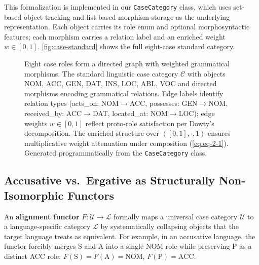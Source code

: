 \documentclass[
]{article}
\makeatletter
\newcommand*\pandocbounded[1]{%
  \sbox\pandoc@box{#1}%
  \Gscale@div\@tempa{\textheight}{\dimexpr\ht\pandoc@box+\dp\pandoc@box\relax}%
  \Gscale@div\@tempb{\linewidth}{\wd\pandoc@box}%
  \ifdim\@tempb\p@<\@tempa\p@\let\@tempa\@tempb\fi%
  \ifdim\@tempa\p@<\p@\scalebox{\@tempa}{\usebox\pandoc@box}%
  \else\usebox{\pandoc@box}%
  \fi%
}
\makeatother
\begin{document}
This formalization is implemented in our \texttt{CaseCategory} class,
which uses set-based object tracking and list-based morphism storage as
the underlying representation. Each object carries its role enum and
optional morphosyntactic features; each morphism carries a relation
label and an enriched weight \(w \in [0,1]\).
\autoref{fig:case-standard} shows the full eight-case standard category.

\begin{figure}
\centering
\pandocbounded{\includegraphics[keepaspectratio,alt={Eight case roles form a directed graph with weighted grammatical morphisms. The standard linguistic case category \textbackslash mathcal\{C\} with objects NOM, ACC, GEN, DAT, INS, LOC, ABL, VOC and directed morphisms encoding grammatical relations. Edge labels identify relation types (acts\_on: NOM\textbackslash toACC, possesses: GEN\textbackslash toNOM, received\_by: ACC\textbackslash toDAT, located\_at: NOM\textbackslash toLOC); edge weights w \textbackslash in \[0,1\] reflect proto-role satisfaction per Dowty's \[@dowty1991thematic\] decomposition. The enriched structure over ({[}0,1{]}, \textbackslash cdot, 1) ensures multiplicative weight attenuation under composition (). Generated programmatically from the CaseCategory class.}]{../figures/case_category_standard.png}}
\caption{Eight case roles form a directed graph with weighted
grammatical morphisms. The standard linguistic case category
\(\mathcal{C}\) with objects NOM, ACC, GEN, DAT, INS, LOC, ABL, VOC and
directed morphisms encoding grammatical relations. Edge labels identify
relation types (acts\_on: NOM\(\to\)ACC, possesses: GEN\(\to\)NOM,
received\_by: ACC\(\to\)DAT, located\_at: NOM\(\to\)LOC); edge weights
\(w \in [0,1]\) reflect proto-role satisfaction per Dowty's
\citeyearpar{dowty1991thematic} decomposition. The enriched structure
over \(([0,1], \cdot, 1)\) ensures multiplicative weight attenuation
under composition (\autoref{eq:eq-2-1}). Generated programmatically from
the \protect\texttt{CaseCategory} class.}\label{fig:case-standard}
\end{figure}

\subsection{Accusative vs.~Ergative as Structurally Non-Isomorphic
Functors}\label{accusative-vs.-ergative-as-structurally-non-isomorphic-functors}

An \textbf{alignment functor} \(F: \mathcal{U} \to \mathcal{L}\)
formally maps a universal case category \(\mathcal{U}\) to a
language-specific category \(\mathcal{L}\) by systematically collapsing
objects that the target language treats as equivalent. For example, in
an accusative language, the functor forcibly merges S and A into a
single NOM role while preserving P as a distinct ACC role:
\(F(\text{S}) = F(\text{A}) = \text{NOM}\),
\(F(\text{P}) = \text{ACC}\).
\end{document}
